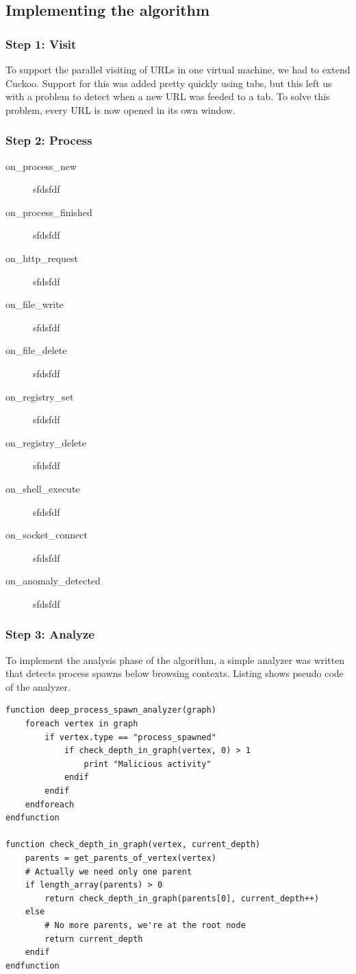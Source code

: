 
\subsection{Implementing the algorithm}

\subsubsection{Step 1: Visit}

To support the parallel visiting of URLs in one virtual machine, we had to extend Cuckoo. Support for this was added pretty quickly using tabs, but this left us with a problem to detect when a new URL was feeded to a tab. To solve this problem, every URL is now opened in its own window.

\subsubsection{Step 2: Process}
\begin{description}
\item[on\_process\_new] sfdsfdf
\item[on\_process\_finished] sfdsfdf
\item[on\_http\_request] sfdsfdf
\item[on\_file\_write] sfdsfdf
\item[on\_file\_delete] sfdsfdf
\item[on\_registry\_set] sfdsfdf
\item[on\_registry\_delete] sfdsfdf
\item[on\_shell\_execute] sfdsfdf
\item[on\_socket\_connect] sfdsfdf
\item[on\_anomaly\_detected] sfdsfdf
\end{description}
\subsubsection{Step 3: Analyze}

To implement the analysis phase of the algorithm, a simple analyzer was written that detects process spawns below browsing contexts. Listing  shows pseudo code of the analyzer.

\begin{lstlisting}
function deep_process_spawn_analyzer(graph)
    foreach vertex in graph
        if vertex.type == "process_spawned"
            if check_depth_in_graph(vertex, 0) > 1
                print "Malicious activity"
            endif
        endif
    endforeach
endfunction

function check_depth_in_graph(vertex, current_depth)
    parents = get_parents_of_vertex(vertex)
    # Actually we need only one parent
    if length_array(parents) > 0
        return check_depth_in_graph(parents[0], current_depth++)
    else
        # No more parents, we're at the root node
        return current_depth
    endif
endfunction
\end{lstlisting}

